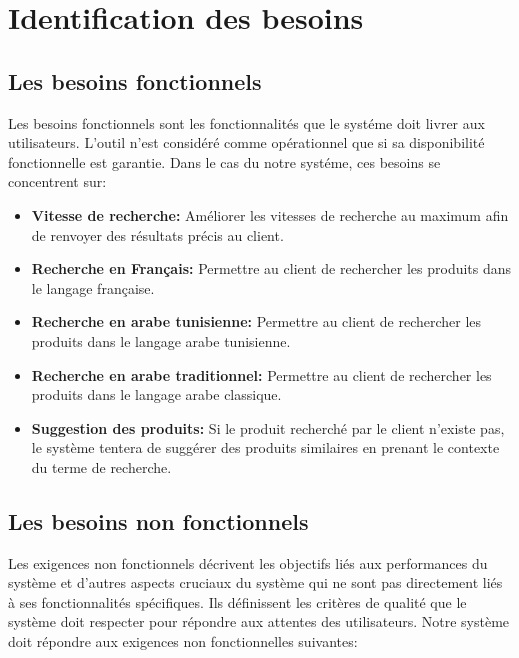 \section{Identification des besoins}
\subsection{Les besoins fonctionnels}
\noindent
Les besoins fonctionnels sont les fonctionnalités que le systéme doit livrer aux utilisateurs.
L’outil n’est considéré comme opérationnel que si sa disponibilité fonctionnelle est garantie.
Dans le cas du notre systéme, ces besoins se concentrent sur:

\begin{itemize}
    \item \small\textbf{Vitesse de recherche: } {Améliorer les vitesses de recherche au maximum afin de renvoyer des résultats précis au client.}
    
    \item \small\textbf{Recherche en Français: } {Permettre au client de rechercher les produits dans le langage française.}

    \item \small\textbf{Recherche en arabe tunisienne: } {Permettre au client de rechercher les produits dans le langage arabe tunisienne.}

    \item \small\textbf{Recherche en arabe traditionnel: } {Permettre au client de rechercher les produits dans le langage arabe classique.}
    
    \item \small\textbf{Suggestion des produits: } {Si le produit recherché par le client n'existe pas, le système tentera de suggérer des produits similaires en prenant le contexte du terme de recherche.}
\end{itemize}

\newpage
\subsection{Les besoins non fonctionnels}
\noindent
Les exigences non fonctionnels décrivent les objectifs liés aux performances du système et d'autres aspects cruciaux du système qui ne sont pas directement liés à ses fonctionnalités spécifiques. Ils définissent les critères de qualité que le système doit respecter pour répondre aux attentes des utilisateurs. Notre système doit répondre aux exigences non fonctionnelles suivantes:

